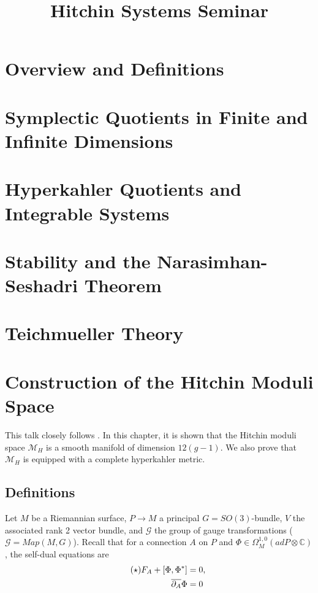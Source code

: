 \documentclass[oneside,english]{amsbook}
\numberwithin{section}{chapter}
\numberwithin{equation}{section}
\numberwithin{figure}{section}
\theoremstyle{plain}
\theoremstyle{definition}
\theoremstyle{remark}
\theoremstyle{definition}
\theoremstyle{definition}
\theoremstyle{plain}
\begin{document}
\title{Hitchin Systems Seminar}

\maketitle
\tableofcontents{}


\chapter{Overview and Definitions}


\chapter{Symplectic Quotients in Finite and Infinite Dimensions}


\chapter{Hyperkahler Quotients and Integrable Systems}


\chapter{Stability and the Narasimhan-Seshadri Theorem}


\chapter{Teichmueller Theory}


\chapter{Construction of the Hitchin Moduli Space}


This talk closely follows \cite{H1}. In this chapter, it is shown
that the Hitchin moduli space $\mathcal{M}_{H}$ is a smooth manifold
of dimension $12(g-1)$. We also prove that $\mathcal{M}_{H}$ is
equipped with a complete hyperkahler metric. 


\section{Definitions}

Let $M$ be a Riemannian surface, $P\rightarrow M$ a principal $G=SO\left(3\right)$-bundle,
$V$ the associated rank 2 vector bundle, and $\mathcal{G}$ the group
of gauge transformations ($\mathcal{G}=Map\left(M,G\right)$). Recall
that for a connection $A$ on $P$ and $\Phi\in\Omega_{M}^{1,0}\left(adP\otimes\mathbb{C}\right)$,
the self-dual equations are 
\begin{align*}
\tag{\ensuremath{\star}}F_{A}+\left[\Phi,\Phi^{*}\right] & =0,\\
\overline{\partial_{A}}\Phi & =0
\end{align*}
\end{document}
